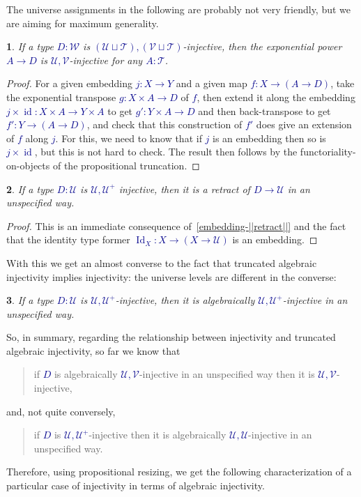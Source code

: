 \documentclass[10pt]{article}
\newcommand{\db}{\textcolor{darkblue}}
\newcommand{\m}[1]{\db{$#1$}}
\newcommand{\id}{\operatorname{id}}
\newcommand{\U}{\mathcal{U}}
\newcommand{\V}{\mathcal{V}}
\newcommand{\W}{\mathcal{W}}
\newcommand{\T}{\mathcal{T}}
\newcommand{\Id}{\operatorname{Id}}
\newtheorem{numbered}{}
\theoremstyle{definition}
\begin{document}
The universe assignments in the following are probably not very
friendly, but we are aiming for maximum generality.
\begin{numbered}
  If a type \m{D : \W} is \m{(\U \sqcup \T),(\V \sqcup \T)}-injective,
  then the exponential power \m{A \to D} is \m{\U,\V}-injective for any \m{A:\T}.
\end{numbered}
\begin{proof}
  For a given embedding \m{j : X \to Y} and a given map \m{f : X \to
    (A \to D)}, take the exponential transpose \m{g : X \times A \to
    D} of \m{f}, then extend it along the embedding \m{j \times \id :
    X \times A \to Y \times A} to get \m{g' : Y \times A \to D} and
  then back-transpose to get \m{f' : Y \to (A \to D)}, and check that
  this construction of \m{f'} does give an extension of \m{f} along
  \m{j}. For this, we need to know that if \m{j} is an embedding then
  so is \m{j \times \id}, but this is not hard to check. The result
  then follows by the functoriality-on-objects of the propositional
  truncation.
\end{proof}


\begin{numbered}
  If a type \m{D:\U} is \m{\U,\U^+} injective, then it is a retract of
  \m{D \to \U} in an unspecified way.
\end{numbered}
\begin{proof}
  This is an immediate consequence of~\ref{embedding-||retract||} and the fact that the
  identity type former \m{\Id_X : X \to (X \to \U)} is an embedding.
\end{proof}

With this we get an almost converse to the fact that truncated
algebraic injectivity implies injectivity: the universe levels are
different in the converse:

\begin{numbered}
  If a type \m{D:\U} is \m{\U,\U^+}-injective, then it is algebraically \m{\U,\U^+}-injective in an unspecified way.
\end{numbered}

So, in summary, regarding the relationship between injectivity and
truncated algebraic injectivity, so far we know that
\begin{quote}
  if \m{D} is algebraically \m{\U,\V}-injective in an unspecified way
  then it is \m{\U,\V}-injective,
\end{quote}
and, not quite conversely,
\begin{quote}
  if \m{D} is \m{\U,\U^+}-injective then it is algebraically \m{\U,\U}-injective in an unspecified way.
\end{quote}
Therefore, using propositional resizing, we get the following
characterization of a particular case of injectivity in terms of
algebraic injectivity.
\end{document}
